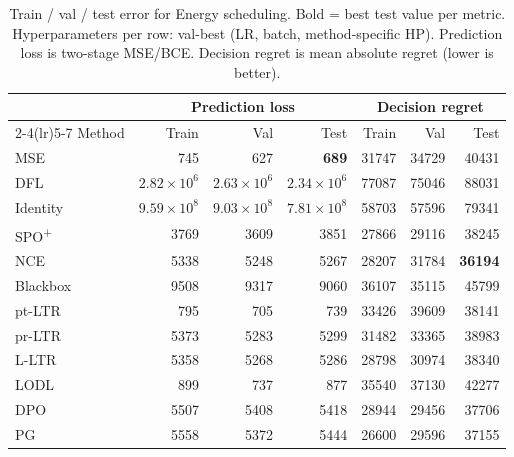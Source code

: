 \begin{table}[h]
\centering
\caption[Train/val/test error for Energy scheduling.]{Train / val / test error for Energy scheduling. Bold = best test value per metric. Hyperparameters per row: val-best (LR, batch, method-specific HP). Prediction loss is two-stage MSE/BCE. Decision regret is mean absolute regret (lower is better).}
\label{tab:err-energy}
\setlength{\tabcolsep}{4pt}
\renewcommand{\arraystretch}{1.05}
\begin{tabular}{@{}lrrrrrr@{}}
\toprule
& \multicolumn{3}{c}{Prediction loss} & \multicolumn{3}{c}{Decision regret} \\
\cmidrule(lr){2-4}\cmidrule(lr){5-7}
Method & Train & Val & Test & Train & Val & Test \\
\midrule
MSE & 745 & 627 & \textbf{689} & 31747 & 34729 & 40431 \\
DFL & $2.82{\times}10^{6}$ & $2.63{\times}10^{6}$ & $2.34{\times}10^{6}$ & 77087 & 75046 & 88031 \\
Identity & $9.59{\times}10^{8}$ & $9.03{\times}10^{8}$ & $7.81{\times}10^{8}$ & 58703 & 57596 & 79341 \\
SPO\textsuperscript{+} & 3769 & 3609 & 3851 & 27866 & 29116 & 38245 \\
NCE & 5338 & 5248 & 5267 & 28207 & 31784 & \textbf{36194} \\
Blackbox & 9508 & 9317 & 9060 & 36107 & 35115 & 45799 \\
pt-LTR & 795 & 705 & 739 & 33426 & 39609 & 38141 \\
pr-LTR & 5373 & 5283 & 5299 & 31482 & 33365 & 38983 \\
L-LTR & 5358 & 5268 & 5286 & 28798 & 30974 & 38340 \\
LODL & 899 & 737 & 877 & 35540 & 37130 & 42277 \\
DPO & 5507 & 5408 & 5418 & 28944 & 29456 & 37706 \\
PG & 5558 & 5372 & 5444 & 26600 & 29596 & 37155 \\
\bottomrule
\end{tabular}
\end{table}

